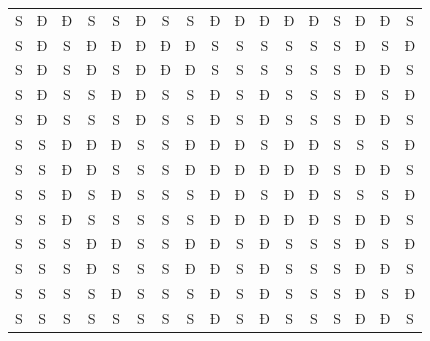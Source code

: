 \begin{table}[H]
\begin{tabular}{|c|c|c|c|c|cccccccccccc|}
		S & Đ & Đ & S & S & Đ & S & S & Đ & Đ & Đ & Đ & Đ & S & Đ & Đ & S \\
		S & Đ & S & Đ & Đ & Đ & Đ & Đ & S & S & S & S & S & S & Đ & S & Đ \\
		S & Đ & S & Đ & S & Đ & Đ & Đ & S & S & S & S & S & S & Đ & Đ & S \\
		S & Đ & S & S & Đ & Đ & S & S & Đ & S & Đ & S & S & S & Đ & S & Đ \\
		S & Đ & S & S & S & Đ & S & S & Đ & S & Đ & S & S & S & Đ & Đ & S \\
		S & S & Đ & Đ & Đ & S & S & Đ & Đ & Đ & S & Đ & Đ & S & S & S & Đ \\
		S & S & Đ & Đ & S & S & S & Đ & Đ & Đ & Đ & Đ & Đ & S & Đ & Đ & S \\
		S & S & Đ & S & Đ & S & S & S & Đ & Đ & S & Đ & Đ & S & S & S & Đ \\
		S & S & Đ & S & S & S & S & S & Đ & Đ & Đ & Đ & Đ & S & Đ & Đ & S \\
		S & S & S & Đ & Đ & S & S & Đ & Đ & S & Đ & S & S & S & Đ & S & Đ \\
		S & S & S & Đ & S & S & S & Đ & Đ & S & Đ & S & S & S & Đ & Đ & S \\
		S & S & S & S & Đ & S & S & S & Đ & S & Đ & S & S & S & Đ & S & Đ \\
		S & S & S & S & S & S & S & S & Đ & S & Đ & S & S & S & Đ & Đ & S \\
		\hline
	\end{tabular}
\end{table}
